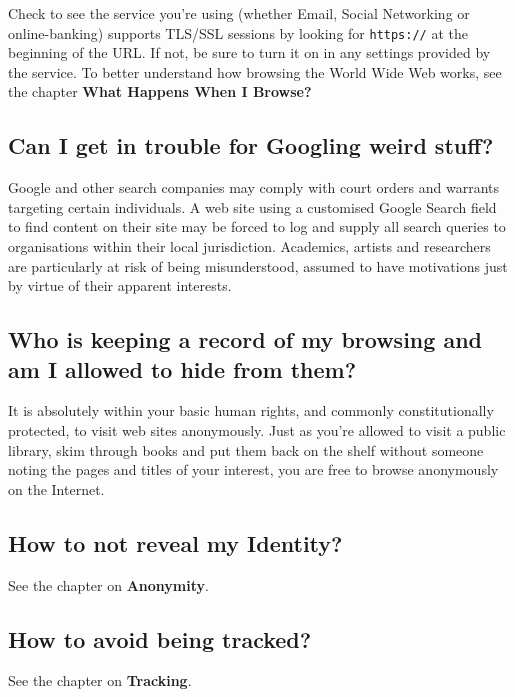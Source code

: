 Check to see the service you're using (whether Email, Social Networking
or online-banking) supports TLS/SSL sessions by looking for
\verb!https://! at the beginning of the URL. If not, be sure to turn it
on in any settings provided by the service. To better understand how
browsing the World Wide Web works, see the chapter \textbf{What Happens
When I Browse?}

\subsection{Can I get in trouble for Googling weird stuff?}

Google and other search companies may comply with court orders and
warrants targeting certain individuals. A web site using a customised
Google Search field to find content on their site may be forced to log
and supply all search queries to organisations within their local
jurisdiction. Academics, artists and researchers are particularly at
risk of being misunderstood, assumed to have motivations just by virtue
of their apparent interests.

\subsection{Who is keeping a record of my browsing and am I allowed to
hide from them?}

It is absolutely within your basic human rights, and commonly
constitutionally protected, to visit web sites anonymously. Just as
you're allowed to visit a public library, skim through books and put
them back on the shelf without someone noting the pages and titles of
your interest, you are free to browse anonymously on the Internet.

\subsection{How to not reveal my Identity?}

See the chapter on \textbf{Anonymity}.

\subsection{How to avoid being tracked?}

See the chapter on \textbf{Tracking}.
